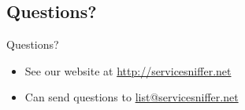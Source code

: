 \documentclass{beamer}
\begin{document}

\subsection{Questions?}
\begin{frame}{Questions?}
    \begin{itemize}
        \item See our website at \url{http://servicesniffer.net}
        \vspace{10mm}
        \item Can send questions to \url{list@servicesniffer.net}
    \end{itemize}
\end{frame}

\end{document}
